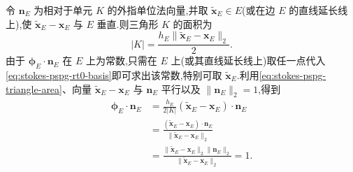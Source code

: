 \begin{note}
令 $\bm{n}_E$ 为相对于单元 $K$ 的外指单位法向量,并取 $\widetilde{\bm{x}}_E\in E$(或在边 $E$ 的直线延长线上),使 $\widetilde{\bm{x}}_E-\bm{x}_E$ 与 $E$ 垂直.则三角形 $K$ 的面积为
\begin{equation}\label{eq:stokes-pspg-triangle-area}
 |K|=\frac{h_E\|\widetilde{\bm{x}}_E-\bm{x}_E\|_2}{2}.
\end{equation}
由于 $\symbf{\phi}_E\cdot\bm{n}_E$ 在 $E$ 上为常数,只需在 $E$ 上(或其直线延长线上)取任一点代入\cref{eq:stokes-pspg-rt0-basis}即可求出该常数,特别可取 $\widetilde{\bm{x}}_E$.利用\cref{eq:stokes-pspg-triangle-area}、向量 $\widetilde{\bm{x}}_E-\bm{x}_E$ 与 $\bm{n}_E$ 平行以及 $\|\bm{n}_E\|_2=1$,得到
\begin{equation}\label{eq:stokes-pspg-rt0-normal-value}
\begin{aligned}
 \symbf{\phi}_E\cdot\bm{n}_E
 &=\frac{h_E}{2|K|}
    (\widetilde{\bm{x}}_E-\bm{x}_E)\cdot\bm{n}_E\\
 &=\frac{(\widetilde{\bm{x}}_E-\bm{x}_E)\cdot\bm{n}_E}
          {\|\widetilde{\bm{x}}_E-\bm{x}_E\|_2}\\
 &=\frac{\|\widetilde{\bm{x}}_E-\bm{x}_E\|_2
          \|\bm{n}_E\|_2}
         {\|\widetilde{\bm{x}}_E-\bm{x}_E\|_2}=1.
\end{aligned}
\end{equation}


\end{note}
